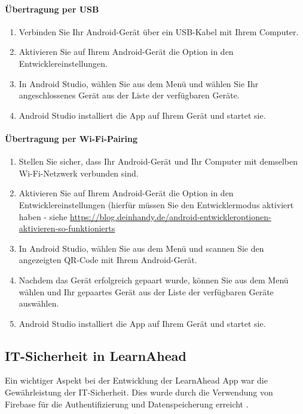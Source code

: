 \paragraph{Übertragung per USB}
\begin{enumerate}
    \item Verbinden Sie Ihr Android-Gerät über ein USB-Kabel mit Ihrem Computer.
    \item Aktivieren Sie auf Ihrem Android-Gerät die Option  in den Entwicklereinstellungen.
    \item In Android Studio, wählen Sie  aus dem  Menü und wählen Sie Ihr angeschlossenes Gerät aus der Liste der verfügbaren Geräte.
    \item Android Studio installiert die App auf Ihrem Gerät und startet sie.
\end{enumerate}

\paragraph{Übertragung per Wi-Fi-Pairing}
\begin{enumerate}
    \item Stellen Sie sicher, dass Ihr Android-Gerät und Ihr Computer mit demselben Wi-Fi-Netzwerk verbunden sind.
    \item Aktivieren Sie auf Ihrem Android-Gerät die Option  in den Entwicklereinstellungen (hierfür müssen Sie den Entwicklermodus aktiviert haben - siehe \href{https://blog.deinhandy.de/android-entwickleroptionen-aktivieren-so-funktionierts}{https://blog.deinhandy.de/android-entwickleroptionen-aktivieren-so-funktionierts}
    \item In Android Studio, wählen Sie  aus dem  Menü und scannen Sie den angezeigten QR-Code mit Ihrem Android-Gerät.
    \item Nachdem das Gerät erfolgreich gepaart wurde, können Sie  aus dem  Menü wählen und Ihr gepaartes Gerät aus der Liste der verfügbaren Geräte auswählen.
    \item Android Studio installiert die App auf Ihrem Gerät und startet sie.
\end{enumerate}

\subsection{IT-Sicherheit in LearnAhead}
Ein wichtiger Aspekt bei der Entwicklung der LearnAhead App war die Gewährleistung der IT-Sicherheit. Dies wurde durch die Verwendung von Firebase für die Authentifizierung und Datenspeicherung erreicht \cite{firebase_overview}.\newline
